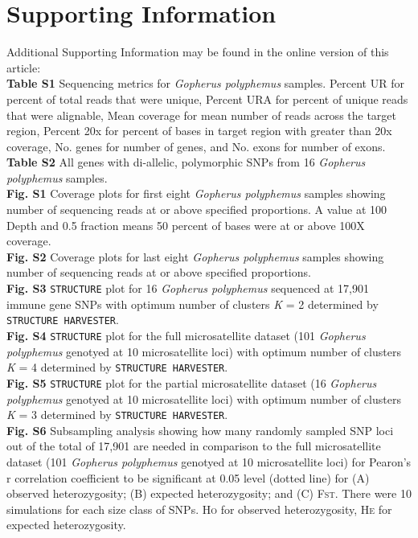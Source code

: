 \documentclass[english]{article}\usepackage[]{graphicx}\usepackage[]{color}
\begin{document}
\section*{Supporting Information}
\noindent
Additional Supporting Information may be found in the online version of this article:\\
\textbf{Table S1} Sequencing metrics for \textit{Gopherus polyphemus} samples. Percent UR for percent of total reads that were unique, Percent URA for percent of unique reads that were alignable, Mean coverage for mean number of reads across the target region, Percent 20x for percent of bases in target region with greater than 20x coverage, No. genes for number of genes, and No. exons for number of exons.\\
\textbf{Table S2} All genes with di-allelic, polymorphic SNPs from 16 \textit{Gopherus polyphemus} samples.\\
\textbf{Fig. S1} Coverage plots for first eight \textit{Gopherus polyphemus} samples showing number of sequencing reads at or above specified proportions. A value at 100 Depth and 0.5 fraction means 50 percent of bases were at or above 100X coverage.\\
\textbf{Fig. S2} Coverage plots for last eight \textit{Gopherus polyphemus} samples showing number of sequencing reads at or above specified proportions.\\
\textbf{Fig. S3} \texttt{STRUCTURE} plot for 16 \textit{Gopherus polyphemus} sequenced at 17,901 immune gene SNPs with optimum number of clusters \textit{K} = 2 determined by \texttt{STRUCTURE HARVESTER}.\\
\textbf{Fig. S4} \texttt{STRUCTURE} plot for the full microsatellite dataset (101 \textit{Gopherus polyphemus} genotyed at 10 microsatellite loci) with optimum number of clusters \textit{K} = 4 determined by \texttt{STRUCTURE HARVESTER}.\\
\textbf{Fig. S5} \texttt{STRUCTURE} plot for the partial microsatellite dataset (16 \textit{Gopherus polyphemus} genotyed at 10 microsatellite loci) with optimum number of clusters \textit{K} = 3 determined by \texttt{STRUCTURE HARVESTER}.\\
\textbf{Fig. S6} Subsampling analysis showing how many randomly sampled SNP loci out of the total of 17,901 are needed in comparison to the full microsatellite dataset (101 \textit{Gopherus polyphemus} genotyed at 10 microsatellite loci) for Pearon's r correlation coefficient to be significant at 0.05 level (dotted line) for (A) observed heterozygosity; (B) expected heterozygosity; and (C) \textsc{Fst}. There were 10 simulations for each size class of SNPs. \textsc{Ho} for observed heterozygosity, \textsc{He} for expected heterozygosity.\\
\end{document}
